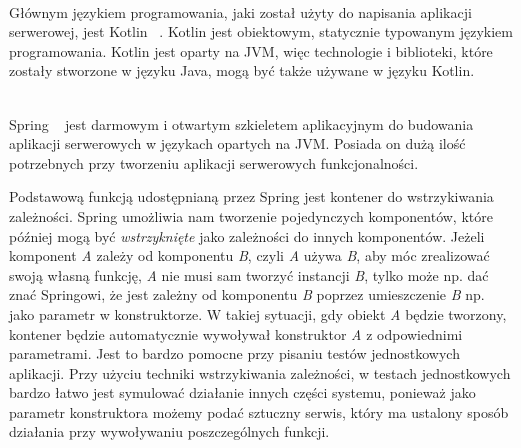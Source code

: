 \begin{description}[leftmargin={15pt},labelindent={0pt}]

  \item[Kotlin] \hfill \\ Głównym językiem programowania, jaki został użyty do napisania aplikacji serwerowej, jest Kotlin ~\cite{ref_kotlin_doc}. Kotlin jest obiektowym, statycznie typowanym językiem programowania. Kotlin jest oparty na JVM, więc technologie i biblioteki, które zostały stworzone w języku Java, mogą być także używane w języku Kotlin.

  \vspace{0.4cm}

  \item[Spring] \hfill \\ Spring ~\cite{ref_spring_doc} jest darmowym i otwartym szkieletem aplikacyjnym do budowania aplikacji serwerowych w językach opartych na JVM. Posiada on dużą ilość potrzebnych przy tworzeniu aplikacji serwerowych funkcjonalności.

    Podstawową funkcją udostępnianą przez Spring jest kontener do wstrzykiwania zależności. Spring umożliwia nam tworzenie pojedynczych komponentów, które później mogą być \emph{wstrzyknięte} jako zależności do innych komponentów. Jeżeli komponent \emph{A} zależy od komponentu \emph{B}, czyli \emph{A} używa \emph{B}, aby móc zrealizować swoją własną funkcję, \emph{A} nie musi sam tworzyć instancji \emph{B}, tylko może np. dać znać Springowi, że jest zależny od komponentu \emph{B} poprzez umieszczenie \emph{B} np. jako parametr w konstruktorze. W takiej sytuacji, gdy obiekt \emph{A} będzie tworzony, kontener będzie automatycznie wywoływał konstruktor \emph{A} z odpowiednimi parametrami. Jest to bardzo pomocne przy pisaniu testów jednostkowych aplikacji. Przy użyciu techniki wstrzykiwania zależności, w testach jednostkowych bardzo łatwo jest symulować działanie innych części systemu, ponieważ jako parametr konstruktora możemy podać sztuczny serwis, który ma ustalony sposób działania przy wywoływaniu poszczególnych funkcji.


\end{description}
